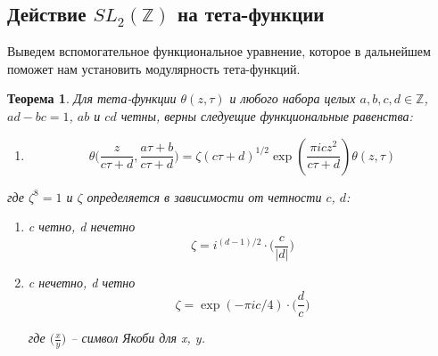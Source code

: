 \documentclass{article}
\newcommand{\ZZ}{\mathbb{Z}}
\theoremstyle{break}
\newtheorem{theorem}{Теорема}[section]
\begin{document}
\subsection{Действие $SL_2(\ZZ)$ на тета-функции}
	Выведем вспомогательное функциональное уравнение, которое в дальнейшем поможет нам 
	установить модулярность тета-функций.
\begin{theorem}
	Для тета-функции $\theta(z, \tau)$ и любого набора целых $a, b, c, d \in \ZZ$, $ad - bc=1$, $ab$ и $cd$ четны,  верны следуещие функциональные равенства:
	
	\begin{enumerate}[start=1, label={(\bfseries F\arabic*):}]
		\item 
		\begin{equation}
		\theta \Big( \frac{z}{c \tau + d}, \frac{a \tau + b}{c \tau + d} \Big) = 
		\zeta (c \tau + d)^{1/2} \exp{(\frac{\pi i c z^2}{c\tau + d})} \theta(z, \tau)
		\end{equation}
	\end{enumerate}
	
	где $\zeta^8=1$ и $\zeta$ определяется в зависимости от четности $c$, $d$:
	\begin{enumerate}
		\item c четно, d нечетно
		\begin{equation}
		\zeta = i^{(d - 1)/2} \cdot \Big( \frac{c}{|d|} \Big)
		\end{equation}
		\item c нечетно, d четно
		\begin{equation}
		\zeta = \exp{(-\pi i c / 4)} \cdot \Big( \frac{d}{c} \Big)
		\end{equation}
		
		где $\Big( \frac{x}{y} \Big)$ -- символ Якоби для x, y.
	\end{enumerate}
\end{theorem}
\end{document}
